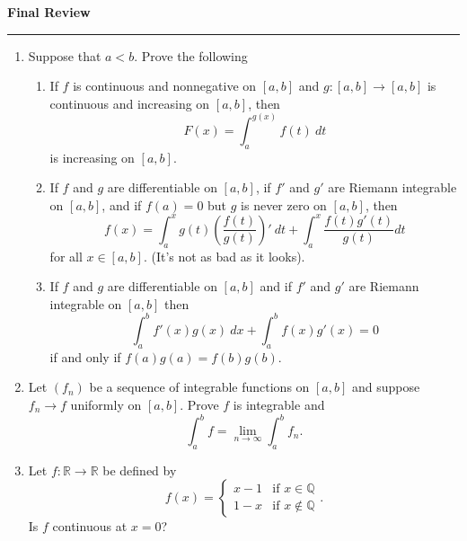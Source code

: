 \documentclass[11pt,letterpaper]{report}
\newcommand{\reals}{\mathbb{R}}
\newcommand{\rationals}{\mathbb{Q}}
\begin{document}
\begin{center}
{\bf \Large Final Review} %
\vspace{0.2cm}
\hrule
\end{center}

\begin{enumerate}
	\item Suppose that $a<b$. Prove the following
	\begin{enumerate}
		\item If $f$ is continuous and nonnegative on $[a,b]$ and $g:[a,b]\to [a,b]$ is continuous and increasing on $[a,b]$, then
		\[
		F(x) = \int_a^{g(x)}f(t)\ dt
		\]
		is increasing on $[a,b]$.
		\vfill

		\item If $f$ and $g$ are differentiable on $[a,b]$, if $f'$ and $g'$ are Riemann integrable on $[a,b]$, and if $f(a) = 0$ but $g$ is never zero on $[a,b]$, then
		\[
		f(x) = \int_a^xg(t)\left(\frac{f(t)}{g(t)}\right)'\ dt + \int_a^x\frac{f(t)g'(t)}{g(t)}dt
		\]
		for all $x\in [a,b]$. (It's not as bad as it looks).
		\vfill
		\item If $f$ and $g$ are differentiable on $[a,b]$ and if $f'$ and $g'$ are Riemann integrable on $[a,b]$ then
		\[
		\int_a^bf'(x)g(x)\ dx + \int_a^bf(x)g'(x) = 0
		\]
		if and only if $f(a)g(a)=f(b)g(b)$.
		\vfill
	\end{enumerate}

	\item Let $(f_n)$ be a sequence of integrable functions on $[a,b]$ and suppose $f_n\to f$ uniformly on $[a,b]$. Prove $f$ is integrable and
	\[
	\int_a^bf = \lim_{n\to \infty}\int_a^bf_n.
	\]
	\vfill\null\pagebreak

	\item Let $f:\reals\to \reals$ be defined by
	\[
	f(x) = \begin{cases}
		x-1&\text{if }x\in \rationals\\
		1-x&\text{if }x\notin \rationals
	\end{cases}.
	\]
	Is $f$ continuous at $x=0$?
	\vfill


\end{enumerate}
\end{document}
